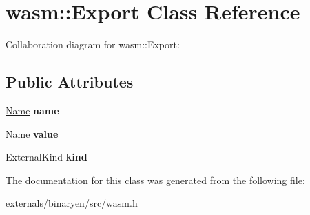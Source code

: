 \hypertarget{classwasm_1_1_export}{}\section{wasm\+:\+:Export Class Reference}
\label{classwasm_1_1_export}


Collaboration diagram for wasm\+:\+:Export\+:
\subsection*{Public Attributes}
\begin{DoxyCompactItemize}
\item 
\mbox{\label{classwasm_1_1_export_a74679d2bb7f8bc860bf537d6ec192893}} 
\mbox{\hyperlink{structwasm_1_1_name}{Name}} {\bfseries name}
\item 
\mbox{\label{classwasm_1_1_export_a4d35b58333c51e4f4043d6a1fc2fec55}} 
\mbox{\hyperlink{structwasm_1_1_name}{Name}} {\bfseries value}
\item 
\mbox{\label{classwasm_1_1_export_a5758fb70dcd7d41ea97cde0f722013a6}} 
External\+Kind {\bfseries kind}
\end{DoxyCompactItemize}


The documentation for this class was generated from the following file\+:\begin{DoxyCompactItemize}
\item 
externals/binaryen/src/wasm.\+h\end{DoxyCompactItemize}

